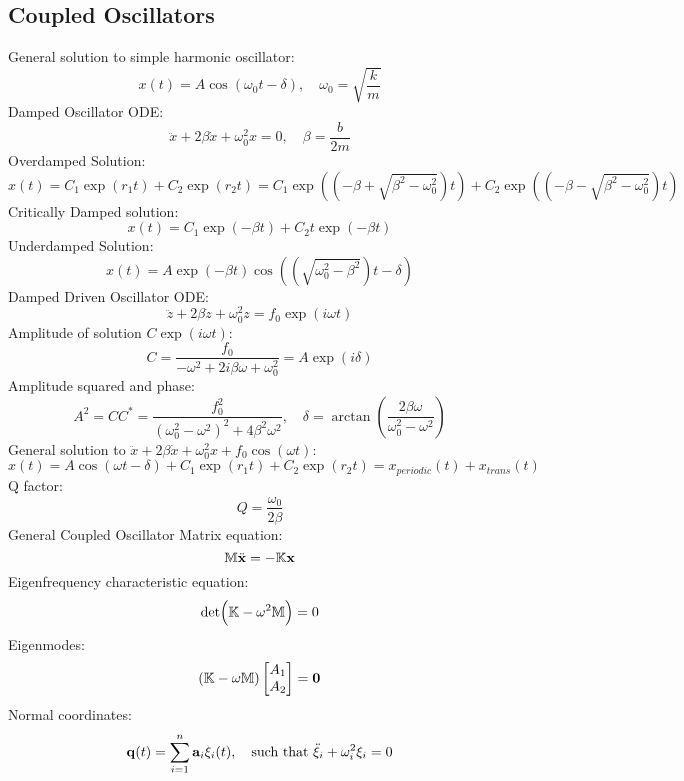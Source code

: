 \documentclass[../PHYS306Notes.tex]{subfiles}
\begin{document}
\subsection{Coupled Oscillators}
General solution to simple harmonic oscillator:
\begin{equation}
    x(t) = A\cos(\omega_0 t - \delta), \quad \omega_0 = \sqrt{\frac{k}{m}}
\end{equation}
Damped Oscillator ODE:
\begin{equation}
    \ddot{x} + 2\beta\dot{x} + \omega_0^2x = 0, \quad \beta = \frac{b}{2m}
\end{equation}
Overdamped Solution:
\begin{equation}
    x(t) = C_1\exp(r_1t) + C_2\exp(r_2t) = C_1\exp(\left(-\beta + \sqrt{\beta^2 - \omega_0^2}\right)t) + C_2\exp(\left(-\beta - \sqrt{\beta^2 - \omega_0^2}\right)t)
\end{equation}
Critically Damped solution:
\begin{equation}
    x(t) = C_1\exp(-\beta t) + C_2t\exp(-\beta t)
\end{equation}
Underdamped Solution:
\begin{equation}
    x(t) = A\exp(-\beta t)\cos(\left(\sqrt{\omega_0^2 - \beta^2}\right)t - \delta)
\end{equation}
Damped Driven Oscillator ODE:
\begin{equation}
    \ddot{z} + 2\beta\dot{z} + \omega_0^2z = f_0\exp(i\omega t)
\end{equation}
Amplitude of solution $C\exp(i\omega t)$:
\begin{equation}
    C = \frac{f_0}{-\omega^2 + 2i\beta \omega + \omega_0^2} = A\exp(i\delta)
\end{equation}
Amplitude squared and phase:
\begin{equation}
    A^2 = CC^* = \frac{f_0^2}{(\omega_0^2 - \omega^2)^2 + 4\beta^2\omega^2}, \quad \delta = \arctan(\frac{2\beta \omega}{\omega_0^2 - \omega^2})
\end{equation}
General solution to $\ddot{x} + 2\beta\dot{x} + \omega_0^2x + f_0\cos(\omega t)$:
\begin{equation}
    x(t) = A\cos(\omega t - \delta) + C_1\exp(r_1 t) + C_2\exp(r_2t) = x_{periodic}(t) + x_{trans}(t)
\end{equation}
Q factor:
\begin{equation}
    Q = \frac{\omega_0}{2\beta}
\end{equation}
General Coupled Oscillator Matrix equation:
\begin{equation}
    \mathbb{M}\ddot{\mathbf{x}} = -\mathbb{K}\mathbf{x}
\end{equation}
Eigenfrequency characteristic equation:
\begin{equation}
    \det(\mathbb{K} - \omega^2\mathbb{M}) = 0
\end{equation}
Eigenmodes:
\begin{equation}
    (\mathbb{K} - \omega\mathbb{M})\begin{bmatrix}A_1 \\A_2\end{bmatrix} = \mathbf{0}
\end{equation}
Normal coordinates:
\begin{equation}
    \mathbf{q}(t) = \sum_{i=1}^n\mathbf{a}_i\xi_i(t), \quad \text{such that } \ddot{\xi}_i + \omega_i^2\xi_i = 0
\end{equation}
\end{document}
